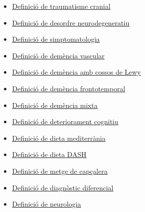 \documentclass[a4paper,12pt]{report}
\begin{document}
\begin{itemize}
    \item \href{https://medlineplus.gov/spanish/ency/article/000028.htm#:~:text=Un%20traumatismo%20craneal%20cerrado%20significa,cráneo%20e%20ingresó%20al%20cerebro.}{\underline{Definició de traumatisme cranial}}
    \item \href{https://www.cancer.gov/espanol/publicaciones/diccionarios/diccionario-cancer/def/trastorno-neurodegenerativo}{\underline{Definició de desordre neurodegeneratiu}}
    \item \href{https://definicion.de/sintomatologia/}{\underline{Definició de simptomatologia}}
    \item \href{https://www.alzheimers.gov/es/alzheimer-demencias/demencia-vascular}{\underline{Definició de demència vascular}}
    \item \href{https://www.mayoclinic.org/es-es/diseases-conditions/lewy-body-dementia/symptoms-causes/syc-20352025}{\underline{Definició de demència amb cossos de Lewy}}
    \item \href{https://www.mayoclinic.org/es-es/diseases-conditions/frontotemporal-dementia/symptoms-causes/syc-20354737#:~:text=Descripci%C3%B3n%20general,la%20conducta%20y%20el%20lenguaje.}{\underline{Definició de demència frontotemporal}}
    \item \href{https://www.universidadviu.com/es/actualidad/nuestros-expertos/demencia-mixta-causas-sintomas-y-tratamientos#:~:text=La%20demencia%20mixta%20es%20un,Alzheimer%20y%20de%20demencia%20vascular.}{\underline{Definició de demència mixta}}
    \item \href{https://www.cancer.gov/espanol/publicaciones/diccionarios/diccionario-cancer/def/deterioro-cognitivo}{\underline{Definició de deteriorament cognitiu}}
    \item \href{https://medlineplus.gov/spanish/ency/patientinstructions/000110.htm}{\underline{Definició de dieta mediterrània}}
    \item \href{https://medlineplus.gov/spanish/ency/patientinstructions/000784.htm}{\underline{Definició de dieta DASH}}
    \item \href{https://medlineplus.gov/spanish/ency/article/001939.htm}{\underline{Definició de metge de capçalera}}
    \item \href{https://ca.wikipedia.org/wiki/Diagnosi_diferencial}{\underline{Definició de diagnòstic diferencial}}
    \item \href{https://neurologiaclinica.es/neurologo-y-neurologia/#:~:text=La%20neurolog%C3%ADa%20es%20la%20especialidad,la%20especialidad%20cl%C3%ADnica%20por%20excelencia.}{\underline{Definició de neurologia}}

\end{itemize}
\end{document}
